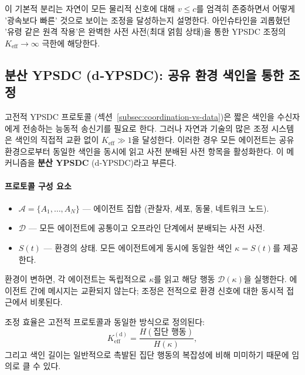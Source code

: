 \documentclass[11pt,a4paper]{article}
\begin{document}
이 기본적 분리는 자연이 모든 물리적 신호에 대해 $v \leq c$를 엄격히 존중하면서 어떻게 '광속보다 빠른' 것으로 보이는 조정을 달성하는지 설명한다. 아인슈타인을 괴롭혔던 '유령 같은 원격 작용'은 완벽한 사전 사전(최대 얽힘 상태)을 통한 YPSDC 조정의 $K_{\mathrm{eff}} \to \infty$ 극한에 해당한다.

\subsection{분산 YPSDC (d‑YPSDC): 공유 환경 색인을 통한 조정}
\label{subsec:d-ypsdc}

고전적 YPSDC 프로토콜 (섹션~\ref{subsec:coordination-vs-data})은 짧은 색인을 수신자에게 전송하는 능동적 송신기를 필요로 한다. 그러나 자연과 기술의 많은 조정 시스템은 색인의 직접적 교환 없이 $K_{\mathrm{eff}} \gg 1$을 달성한다. 이러한 경우 모든 에이전트는 공유 환경으로부터 동일한 색인을 동시에 읽고 사전 분배된 사전 항목을 활성화한다. 이 메커니즘을 \textbf{분산 YPSDC} (d‑YPSDC)라고 부른다.

\paragraph*{프로토콜 구성 요소}
\begin{itemize}[leftmargin=*]
	\item $\mathcal{A} = \{A_1,\dots,A_N\}$ — 에이전트 집합 (관찰자, 세포, 동물, 네트워크 노드).
	\item $\mathcal{D}$ — 모든 에이전트에 공통이고 오프라인 단계에서 분배되는 사전 사전.
	\item $S(t)$ — 환경의 상태. 모든 에이전트에게 동시에 동일한 색인 $\kappa = S(t)$를 제공한다.
\end{itemize}
환경이 변하면, 각 에이전트는 독립적으로 $\kappa$를 읽고 해당 행동 $\mathcal{D}(\kappa)$을 실행한다. 에이전트 간에 메시지는 교환되지 않는다; 조정은 전적으로 환경 신호에 대한 동시적 접근에서 비롯된다.

조정 효율은 고전적 프로토콜과 동일한 방식으로 정의된다:
\[
K_{\mathrm{eff}}^{\mathrm{(d)}} = \frac{H(\text{집단 행동})}{H(\kappa)},
\]
그리고 색인 길이는 일반적으로 촉발된 집단 행동의 복잡성에 비해 미미하기 때문에 임의로 클 수 있다.
\end{document}
